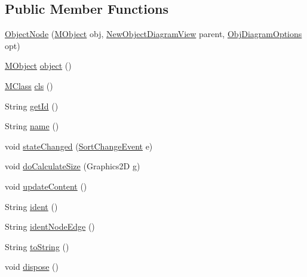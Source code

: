 \subsection*{Public Member Functions}
\begin{DoxyCompactItemize}
\item 
\hyperlink{classorg_1_1tzi_1_1use_1_1gui_1_1views_1_1diagrams_1_1objectdiagram_1_1_object_node_aba9c4964370156a9a26fa8b31192e9ef}{Object\-Node} (\hyperlink{interfaceorg_1_1tzi_1_1use_1_1uml_1_1sys_1_1_m_object}{M\-Object} obj, \hyperlink{classorg_1_1tzi_1_1use_1_1gui_1_1views_1_1diagrams_1_1objectdiagram_1_1_new_object_diagram_view}{New\-Object\-Diagram\-View} parent, \hyperlink{classorg_1_1tzi_1_1use_1_1gui_1_1views_1_1diagrams_1_1objectdiagram_1_1_obj_diagram_options}{Obj\-Diagram\-Options} opt)
\item 
\hyperlink{interfaceorg_1_1tzi_1_1use_1_1uml_1_1sys_1_1_m_object}{M\-Object} \hyperlink{classorg_1_1tzi_1_1use_1_1gui_1_1views_1_1diagrams_1_1objectdiagram_1_1_object_node_a9c2042a6de242750d94a3a9695567470}{object} ()
\item 
\hyperlink{interfaceorg_1_1tzi_1_1use_1_1uml_1_1mm_1_1_m_class}{M\-Class} \hyperlink{classorg_1_1tzi_1_1use_1_1gui_1_1views_1_1diagrams_1_1objectdiagram_1_1_object_node_a8a9ccb3526fafb3c5b1bbf7d2304fce1}{cls} ()
\item 
String \hyperlink{classorg_1_1tzi_1_1use_1_1gui_1_1views_1_1diagrams_1_1objectdiagram_1_1_object_node_ab69fd0cfd4b1ab91d31500dfe493cf7f}{get\-Id} ()
\item 
String \hyperlink{classorg_1_1tzi_1_1use_1_1gui_1_1views_1_1diagrams_1_1objectdiagram_1_1_object_node_a6702154027a2a7cc3d70e1c16d79cd49}{name} ()
\item 
void \hyperlink{classorg_1_1tzi_1_1use_1_1gui_1_1views_1_1diagrams_1_1objectdiagram_1_1_object_node_a22096230dd72d9c4db4fa083109c4d73}{state\-Changed} (\hyperlink{classorg_1_1tzi_1_1use_1_1gui_1_1main_1_1_model_browser_sorting_1_1_sort_change_event}{Sort\-Change\-Event} e)
\item 
void \hyperlink{classorg_1_1tzi_1_1use_1_1gui_1_1views_1_1diagrams_1_1objectdiagram_1_1_object_node_a8a11c8937b7f0b3c2e92b81c2f8c5ad7}{do\-Calculate\-Size} (Graphics2\-D g)
\item 
void \hyperlink{classorg_1_1tzi_1_1use_1_1gui_1_1views_1_1diagrams_1_1objectdiagram_1_1_object_node_ae582b2d06bc48a623b0f97d84666b87e}{update\-Content} ()
\item 
String \hyperlink{classorg_1_1tzi_1_1use_1_1gui_1_1views_1_1diagrams_1_1objectdiagram_1_1_object_node_a6050c4fedf6c5c84f82708189fd336ee}{ident} ()
\item 
String \hyperlink{classorg_1_1tzi_1_1use_1_1gui_1_1views_1_1diagrams_1_1objectdiagram_1_1_object_node_ad0416be55b1b881a4ee38a95639ff0c9}{ident\-Node\-Edge} ()
\item 
String \hyperlink{classorg_1_1tzi_1_1use_1_1gui_1_1views_1_1diagrams_1_1objectdiagram_1_1_object_node_acd2e2f866b51e8e452b6e17365738e72}{to\-String} ()
\item 
void \hyperlink{classorg_1_1tzi_1_1use_1_1gui_1_1views_1_1diagrams_1_1objectdiagram_1_1_object_node_a508148326e1c9fedf37682c28ad161d3}{dispose} ()
\end{DoxyCompactItemize}
